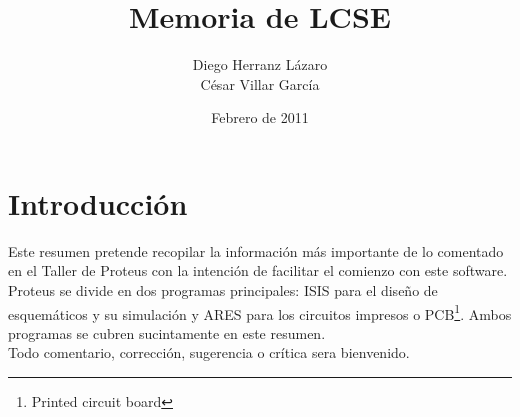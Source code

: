 \documentclass[a4paper, 12pt]{article}
\title{\textbf{Memoria de LCSE}}
\author{Diego Herranz Lázaro\\
	César Villar García}
\date{Febrero de 2011}
\begin{document}
\maketitle


	
\newpage
\tableofcontents

\newpage
\section{Introducción}
	Este resumen pretende recopilar la información más importante de lo comentado en el Taller de Proteus con la intención de facilitar el comienzo con este software. \\
	
	Proteus se divide en dos programas principales: ISIS para el diseño de esquemáticos y su simulación y ARES para los circuitos impresos o PCB\footnote{Printed circuit board}. Ambos programas se cubren sucintamente en este resumen.\\	

	Todo comentario, corrección, sugerencia o crítica sera bienvenido.

\newpage


\newpage


\newpage

	
\end{document}
